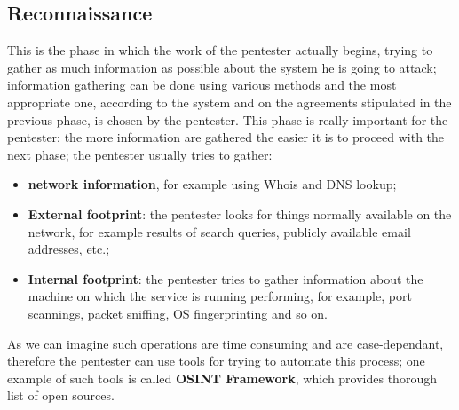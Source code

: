 \subsection{Reconnaissance}
This is the phase in which the work of the pentester actually begins, trying to gather as much information as possible about the system he is going to attack; information gathering can be done using various methods and the most appropriate one, according to the system and on the agreements stipulated in the previous phase, is chosen by the pentester.
\newline
This phase is really important for the pentester: the more information are gathered the easier it is to proceed with the next phase; the pentester usually tries to gather:
\begin{itemize}
    \item \textbf{network information}, for example using Whois and DNS lookup;
    \item \textbf{External footprint}: the pentester looks for things normally available on the network, for example results of search queries, publicly available email addresses, etc.;
    \item \textbf{Internal footprint}: the pentester tries to gather information about the machine on which the service is running performing, for example, port scannings, packet sniffing, OS fingerprinting and so on.
\end{itemize}
As we can imagine such operations are time consuming and are case-dependant, therefore the pentester can use tools for trying to automate this process; one example of such tools is called \textbf{OSINT Framework}, which provides thorough list of open sources.

